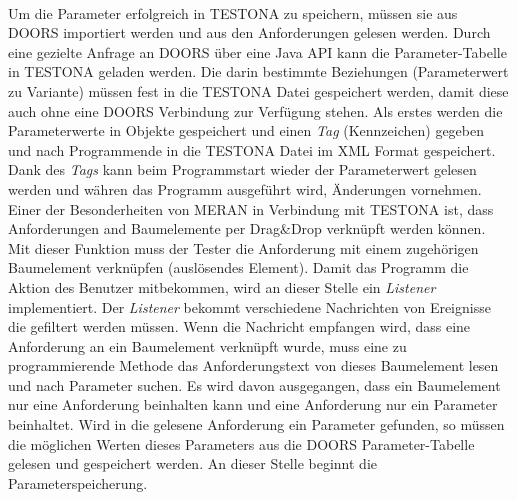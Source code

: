 \paragraph{}

 
Um die Parameter erfolgreich in TESTONA zu speichern, müssen sie aus DOORS importiert werden und aus den Anforderungen gelesen werden. Durch eine gezielte Anfrage an DOORS über eine Java API kann die Parameter-Tabelle in TESTONA geladen werden. Die darin bestimmte Beziehungen (Parameterwert zu Variante) müssen fest in die TESTONA Datei gespeichert werden, damit diese auch ohne eine DOORS Verbindung zur Verfügung stehen. Als erstes werden die Parameterwerte in Objekte gespeichert und einen \textit{Tag} (Kennzeichen) gegeben und nach Programmende in die TESTONA Datei im XML Format gespeichert. Dank des \textit{Tags} kann beim Programmstart wieder der Parameterwert gelesen werden und währen das Programm ausgeführt wird, Änderungen vornehmen.\\

Einer der Besonderheiten von MERAN in Verbindung mit TESTONA ist, dass Anforderungen and Baumelemente per Drag\&Drop verknüpft werden können. Mit dieser Funktion muss der Tester die Anforderung mit einem zugehörigen Baumelement verknüpfen (auslösendes Element). Damit das Programm die Aktion des Benutzer mitbekommen, wird an dieser Stelle ein \textit{Listener} implementiert. Der \textit{Listener} bekommt verschiedene Nachrichten von Ereignisse die gefiltert werden müssen. Wenn die Nachricht empfangen wird, dass eine Anforderung an ein Baumelement verknüpft wurde, muss eine zu programmierende Methode das Anforderungstext von dieses Baumelement lesen und nach Parameter suchen. Es wird davon ausgegangen, dass ein Baumelement nur eine Anforderung beinhalten kann und eine Anforderung nur ein Parameter beinhaltet. Wird in die gelesene Anforderung ein Parameter gefunden, so müssen die möglichen Werten dieses Parameters aus die DOORS Parameter-Tabelle gelesen und gespeichert werden. An dieser Stelle beginnt die Parameterspeicherung.\\


